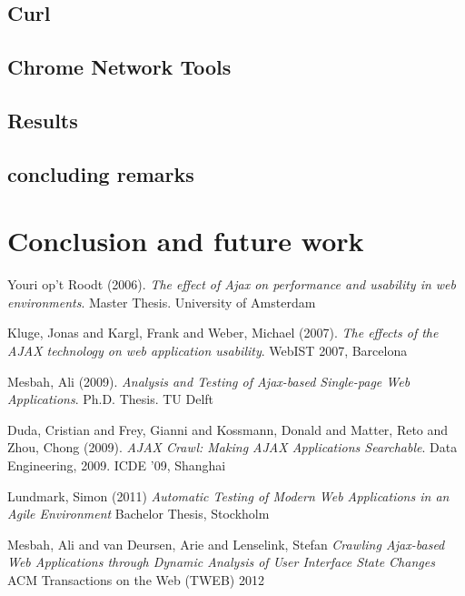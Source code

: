 \documentclass[f,bachelor,binding,twoside,palatino]{WeSTthesis}
\begin{document}
\subsection{Curl}

\subsection{Chrome Network Tools}

\subsection{Results}

\subsection{concluding remarks}

\section{Conclusion and future work}

\begin{thebibliography}{9}

  Youri op't Roodt (2006).
  \emph{The effect of Ajax on performance and usability in web environments}.
  Master Thesis. University of Amsterdam

  Kluge, Jonas and Kargl, Frank and Weber, Michael (2007).
  \emph{The effects of the AJAX technology on web application usability}.
  WebIST 2007, Barcelona

  Mesbah, Ali (2009).
  \emph{Analysis and Testing of Ajax-based Single-page Web Applications}.
  Ph.D. Thesis. TU Delft

  Duda, Cristian and Frey, Gianni and Kossmann, Donald and Matter, Reto and Zhou, Chong (2009).
  \emph{AJAX Crawl: Making AJAX Applications Searchable}.
  Data Engineering, 2009. ICDE '09, Shanghai
  
  Lundmark, Simon (2011)
  \emph{Automatic Testing of Modern Web Applications in an Agile Environment}
  Bachelor Thesis, Stockholm

  Mesbah, Ali and van Deursen, Arie and Lenselink, Stefan
  \emph{Crawling {Ajax}-based Web Applications through Dynamic Analysis of User Interface State Changes}
  ACM Transactions on the Web (TWEB) 2012
  
\end{thebibliography}
\end{document}
